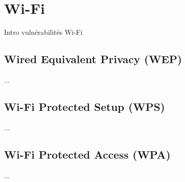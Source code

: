 

\section{Wi-Fi}\label{vulnerabilites:physiques:wi-fi}

Intro vulnérabilités Wi-Fi

\subsection{Wired Equivalent Privacy (WEP)}\label{vulnerabilites:physiques:wi-fi:wep}

...

\subsection{Wi-Fi Protected Setup (WPS)}\label{vulnerabilites:physiques:wi-fi:wps}

...

\subsection{Wi-Fi Protected Access (WPA)}\label{vulnerabilites:physiques:wi-fi:wpa}

...

\endinput

